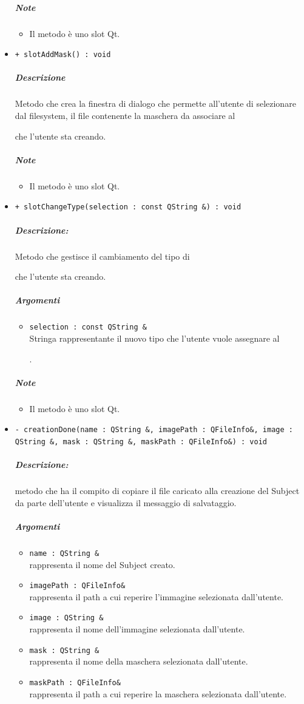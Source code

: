 \begin{itemize}
			\subparagraph{Note}
			\begin{itemize}
				\item Il metodo è uno slot\g{} Qt\g{}.
			\end{itemize}
			\item \color{blue} \verb!+ slotAddMask() : void!
			\color{black}
			\subparagraph{Descrizione} Metodo che crea la finestra di dialogo che permette all'utente di selezionare dal filesystem, il file contenente la maschera da associare al \subject{} che l'utente sta creando.
			\subparagraph{Note}
			\begin{itemize}
				\item Il metodo è uno slot\g{} Qt\g{}.
			\end{itemize}
			\item \color{blue} \verb!+ slotChangeType(selection : const QString &) : void!
			\color{black}
			\subparagraph{Descrizione:} Metodo che gestisce il cambiamento del tipo di \subject{} che l'utente sta creando.
			\color{black}
			\subparagraph{Argomenti}
			\begin{itemize}
				\item \color{RoyalPurple} \verb!selection : const QString &!\\				
\color{black} Stringa rappresentante il nuovo tipo che l'utente vuole assegnare al \subject{}.
			\end{itemize}
			\subparagraph{Note}
			\begin{itemize}
				\item Il metodo è uno slot\g{} Qt\g{}.
			\end{itemize}
			\item \color{blue} \verb!- creationDone(name : QString &, imagePath : QFileInfo&, image : QString &, mask : QString &, maskPath : QFileInfo&) : void!
			\color{black}
			\subparagraph{Descrizione:} metodo che ha il compito di copiare il file caricato alla creazione del Subject\g{} da parte dell'utente e visualizza il messaggio di salvataggio.
			\color{black}
			\subparagraph{Argomenti}
			\begin{itemize}
				\item \color{RoyalPurple} \verb!name : QString &!\\				
\color{black} rappresenta il nome del Subject\g{} creato.
				\item \color{RoyalPurple} \verb!imagePath : QFileInfo&!\\				
\color{black} rappresenta il path a cui reperire l'immagine selezionata dall'utente\g{}.
				\item \color{RoyalPurple} \verb!image : QString &!\\				
\color{black} rappresenta il nome dell'immagine selezionata dall'utente.
				\item \color{RoyalPurple} \verb!mask : QString &!\\				
\color{black} rappresenta il nome della maschera selezionata dall'utente.
				\item \color{RoyalPurple} \verb!maskPath : QFileInfo&!\\				
\color{black} rappresenta il path a cui reperire la maschera selezionata dall'utente.
			\end{itemize}
		\end{itemize}
